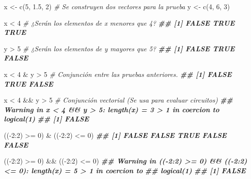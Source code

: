 \documentclass[
]{book}
\newenvironment{Shaded}{\begin{snugshade}}{\end{snugshade}}
\newcommand{\CommentTok}[1]{\textcolor[rgb]{0.56,0.35,0.01}{\textit{#1}}}
\newcommand{\DecValTok}[1]{\textcolor[rgb]{0.00,0.00,0.81}{#1}}
\newcommand{\DocumentationTok}[1]{\textcolor[rgb]{0.56,0.35,0.01}{\textbf{\textit{#1}}}}
\newcommand{\FloatTok}[1]{\textcolor[rgb]{0.00,0.00,0.81}{#1}}
\newcommand{\FunctionTok}[1]{\textcolor[rgb]{0.00,0.00,0.00}{#1}}
\newcommand{\NormalTok}[1]{#1}
\newcommand{\OtherTok}[1]{\textcolor[rgb]{0.56,0.35,0.01}{#1}}
\newcommand{\SpecialCharTok}[1]{\textcolor[rgb]{0.00,0.00,0.00}{#1}}
\begin{document}
\begin{Shaded}
\begin{Highlighting}[]
\NormalTok{x }\OtherTok{\textless{}{-}} \FunctionTok{c}\NormalTok{(}\DecValTok{5}\NormalTok{, }\FloatTok{1.5}\NormalTok{, }\DecValTok{2}\NormalTok{)  }\CommentTok{\# Se construyen dos vectores para la prueba}
\NormalTok{y }\OtherTok{\textless{}{-}} \FunctionTok{c}\NormalTok{(}\DecValTok{4}\NormalTok{, }\DecValTok{6}\NormalTok{, }\DecValTok{3}\NormalTok{)}

\NormalTok{x }\SpecialCharTok{\textless{}} \DecValTok{4}  \CommentTok{\# ¿Serán los elementos de x menores que 4?}
\DocumentationTok{\#\# [1] FALSE  TRUE  TRUE}

\NormalTok{y }\SpecialCharTok{\textgreater{}} \DecValTok{5}  \CommentTok{\# ¿Serán los elementos de y mayores que 5?}
\DocumentationTok{\#\# [1] FALSE  TRUE FALSE}

\NormalTok{x }\SpecialCharTok{\textless{}} \DecValTok{4} \SpecialCharTok{\&}\NormalTok{ y }\SpecialCharTok{\textgreater{}} \DecValTok{5}  \CommentTok{\# Conjunción entre las pruebas anteriores.}
\DocumentationTok{\#\# [1] FALSE  TRUE FALSE}

\NormalTok{x }\SpecialCharTok{\textless{}} \DecValTok{4} \SpecialCharTok{\&\&}\NormalTok{ y }\SpecialCharTok{\textgreater{}} \DecValTok{5}  \CommentTok{\# Conjunción vectorial (Se usa para evaluar circuitos)}
\DocumentationTok{\#\# Warning in x \textless{} 4 \&\& y \textgreater{} 5: \textquotesingle{}length(x) = 3 \textgreater{} 1\textquotesingle{} in coercion to \textquotesingle{}logical(1)\textquotesingle{}}
\DocumentationTok{\#\# [1] FALSE}

\NormalTok{((}\SpecialCharTok{{-}}\DecValTok{2}\SpecialCharTok{:}\DecValTok{2}\NormalTok{) }\SpecialCharTok{\textgreater{}=} \DecValTok{0}\NormalTok{) }\SpecialCharTok{\&}\NormalTok{ ((}\SpecialCharTok{{-}}\DecValTok{2}\SpecialCharTok{:}\DecValTok{2}\NormalTok{) }\SpecialCharTok{\textless{}=} \DecValTok{0}\NormalTok{)}
\DocumentationTok{\#\# [1] FALSE FALSE  TRUE FALSE FALSE}

\NormalTok{((}\SpecialCharTok{{-}}\DecValTok{2}\SpecialCharTok{:}\DecValTok{2}\NormalTok{) }\SpecialCharTok{\textgreater{}=} \DecValTok{0}\NormalTok{) }\SpecialCharTok{\&\&}\NormalTok{ ((}\SpecialCharTok{{-}}\DecValTok{2}\SpecialCharTok{:}\DecValTok{2}\NormalTok{) }\SpecialCharTok{\textless{}=} \DecValTok{0}\NormalTok{)}
\DocumentationTok{\#\# Warning in (({-}2:2) \textgreater{}= 0) \&\& (({-}2:2) \textless{}= 0): \textquotesingle{}length(x) = 5 \textgreater{} 1\textquotesingle{} in coercion to}
\DocumentationTok{\#\# \textquotesingle{}logical(1)\textquotesingle{}}
\DocumentationTok{\#\# [1] FALSE}
\end{Highlighting}
\end{Shaded}
\end{document}
